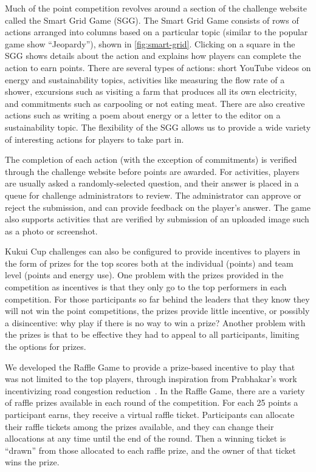 \documentclass{sigchi}
\begin{document}
Much of the point competition revolves around a section of the challenge website called the Smart Grid Game (SGG). The Smart Grid Game consists of rows of actions arranged into columns based on a particular topic (similar to the popular game show ``Jeopardy''), shown in \autoref{fig:smart-grid}. Clicking on a square in the SGG shows details about the action and explains how players can complete the action to earn points. There are several types of actions: short YouTube videos on energy and sustainability topics, activities like measuring the flow rate of a shower, excursions such as visiting a farm that produces all its own electricity, and commitments such as carpooling or not eating meat. There are also creative actions such as writing a poem about energy or a letter to the editor on a sustainability topic. The flexibility of the SGG allows us to provide a wide variety of interesting actions for players to take part in.

The completion of each action (with the exception of commitments) is verified through the challenge website before points are awarded. For activities, players are usually asked a randomly-selected question, and their answer is placed in a queue for challenge administrators to review. The administrator can approve or reject the submission, and can provide feedback on the player's answer. The game also supports activities that are verified by submission of an uploaded image such as a photo or screenshot.

Kukui Cup challenges can also be configured to provide incentives to players in the form of prizes for the top scores both at the individual (points) and team level (points and energy use). One problem with the prizes provided in the competition as incentives is that they only go to the top performers in each competition. For those participants so far behind the leaders that they know they will not win the point competitions, the prizes provide little incentive, or possibly a disincentive: why play if there is no way to win a prize? Another problem with the prizes is that to be effective they had to appeal to all participants, limiting the options for prizes.

We developed the Raffle Game to provide a prize-based incentive to play that was not limited to the top players, through inspiration from Prabhakar's work incentivizing road congestion reduction~\cite{Merugu2009}. In the Raffle Game, there are a variety of raffle prizes available in each round of the competition. For each 25 points a participant earns, they receive a virtual raffle ticket. Participants can allocate their raffle tickets among the prizes available, and they can change their allocations at any time until the end of the round. Then a winning ticket is ``drawn'' from those allocated to each raffle prize, and the owner of that ticket wins the prize.
\end{document}
